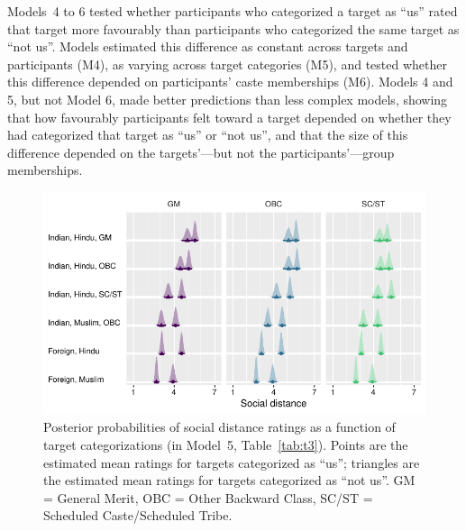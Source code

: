 \documentclass[12pt, a4paper]{article}
\begin{document}
Models~4 to 6 tested whether participants who categorized a target as ``us'' rated that target more favourably than participants who categorized the same target as ``not us''. Models estimated this difference as constant across targets and participants (M4), as varying across target categories (M5), and tested whether this difference depended on participants' caste memberships (M6). Models 4 and 5, but not Model 6, made better predictions than less complex models, showing that how favourably participants felt toward a target depended on whether they had categorized that target as ``us'' or ``not us'', and that the size of this difference depended on the targets'---but not the participants'---group memberships.

\begin{figure}
\centering
\includegraphics[scale=1]{../figures/figure-5}
\caption{
Posterior probabilities of social distance ratings as a function of target categorizations (in Model~5, Table~\ref{tab:t3}). Points are the estimated mean ratings for targets categorized as ``us''; triangles are the estimated mean ratings for targets categorized as ``not us''. GM = General Merit, OBC = Other Backward Class, SC/ST = Scheduled Caste/Scheduled Tribe.
}
\label{fig:f5}
\end{figure}
\end{document}
